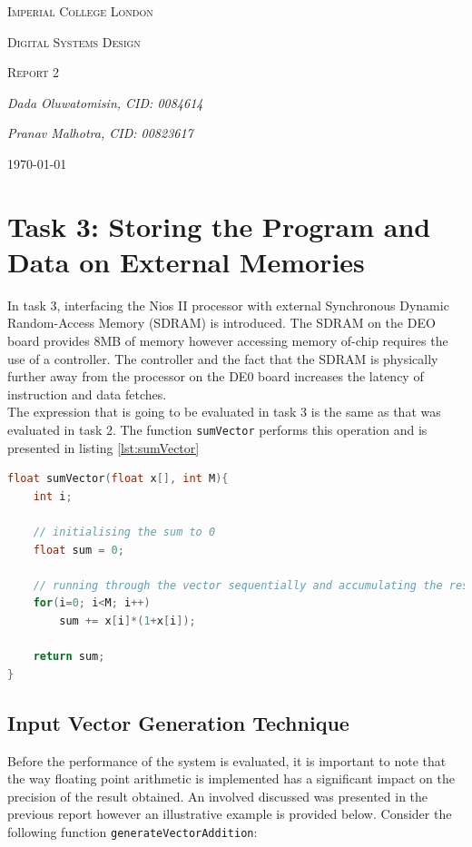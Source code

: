 \documentclass{article}
\begin{document}
\begin{titlepage}
	\centering
	{\scshape\LARGE Imperial College London \par}
	\vspace{2cm}
	{\scshape\Large Digital Systems Design \par}
	\vspace{1cm}
	{\scshape\Large Report 2 \par}
	\vspace{2.5cm}
	{\Large\itshape Dada Oluwatomisin, CID: 0084614 \par}
	\vspace{1.0cm}
	{\Large\itshape Pranav Malhotra, CID: 00823617 \par}
	\vfill
	{\large \today\par}
\end{titlepage}

\newpage
\tableofcontents
\newpage
\section{Task 3: Storing the Program and Data on External Memories}
In task 3, interfacing the Nios II processor with external Synchronous Dynamic Random-Access Memory (SDRAM) is introduced. The SDRAM on the DEO board provides 8MB of memory however accessing memory of-chip requires the use of a controller. The controller and the fact that the SDRAM is physically further away from the processor on the DE0 board increases the latency of instruction and data fetches.\\

The expression that is going to be evaluated in task 3 is the same as that was evaluated in task 2. The function {\tt sumVector} performs this operation and is presented in listing \ref{lst:sumVector}\\

\begin{lstlisting}[language=C, frame=single, caption={\tt sumVector}, label=lst:sumVector]
float sumVector(float x[], int M){
	int i;
	
	// initialising the sum to 0
	float sum = 0;
	
	// running through the vector sequentially and accumulating the result in sum
	for(i=0; i<M; i++)
		sum += x[i]*(1+x[i]);
		
	return sum;
}
\end{lstlisting}

\subsection{Input Vector Generation Technique}\label{sec:gen_vec}
Before the performance of the system is evaluated, it is important to note that the way floating point arithmetic is implemented has a significant impact on the precision of the result obtained. An involved discussed was presented in the previous report however an illustrative example is provided below. Consider the following function {\tt generateVectorAddition}: \\
\end{document}
